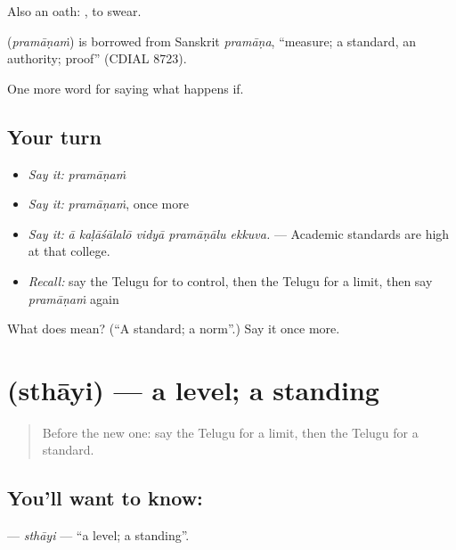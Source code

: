 Also an oath:  , to swear.

\begin{cousinweb}
\textbf{} (\emph{pramāṇaṁ}) is borrowed from Sanskrit \emph{pramāṇa}, \textquotedblleft{}measure; a standard, an authority; proof\textquotedblright{} (CDIAL 8723).
\end{cousinweb}

\begin{grammarlens}[title={What you've built}]
One more word for saying what happens if.
\end{grammarlens}

\subsection*{Your turn}
\begin{itemize}
\raggedright
  \item \emph{Say it:} \emph{pramāṇaṁ}
  \item \emph{Say it:} \emph{pramāṇaṁ}, once more
  \item \emph{Say it:} \emph{ā kaḷāśālalō vidyā pramāṇālu ekkuva.} — Academic standards are high at that college.
  \item \emph{Recall:} say the Telugu for to control, then the Telugu for a limit, then say \emph{pramāṇaṁ} again
\end{itemize}

\begin{tcolorbox}[breakable,colback=teal!4,colframe=teal!35!black,title={Before you move on}]
What does  mean? (\textquotedblleft{}A standard; a norm\textquotedblright{}.) Say it once more.
\end{tcolorbox}
\section[\texorpdfstring{\te{స్థాయి} (sthāyi)}{స్థాయి (sthāyi)}]{ (sthāyi) — a level; a standing}

\label{lesson:TE-C431-sthayi}



\begin{quote}
Before the new one: say the Telugu for a limit, then the Telugu for a standard.
\end{quote}

\subsection*{You'll want to know: }
\textbf{} — \emph{sthāyi} — \textquotedblleft{}a level; a standing\textquotedblright{}.

